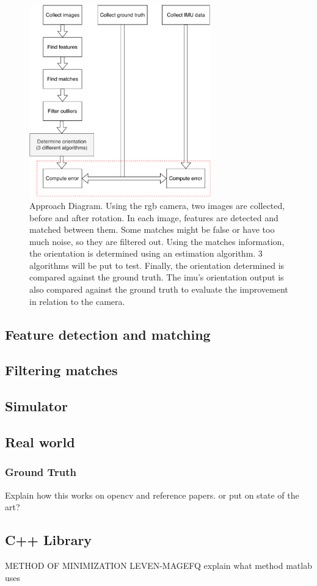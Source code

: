 \begin{figure}[ht]
	\centering
	\includegraphics[width=0.7\textwidth]{images/approach.pdf}
	\caption[Approach Diagram]{Approach Diagram. Using the \acrshort{rgb} camera, two images are collected, before and after rotation. In each image, features are detected and matched between them. Some matches might be false or have too much noise, so they are filtered out. Using the matches information, the orientation is determined using an estimation algorithm. 3 algorithms will be put to test. Finally, the orientation determined is compared against the ground truth. The \acrshort{imu}'s orientation output is also compared against the ground truth to evaluate the improvement in relation to the camera.}
	\label{cha3:methodology:approach}
\end{figure}


\subsection{Feature detection and matching}

\subsection{Filtering matches}

\subsection{Simulator}

\subsection{Real world}

\subsubsection{Ground Truth}

Explain how this works on opencv and reference papers. or put on state of the art?

\subsection{C++ Library}



METHOD OF MINIMIZATION LEVEN-MAGEFQ explain what method matlab uses